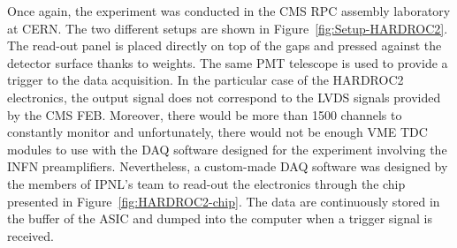 	Once again, the experiment was conducted in the CMS RPC assembly laboratory at CERN. The two different setups are shown in Figure~\ref{fig:Setup-HARDROC2}. The read-out panel is placed directly on top of the gaps and pressed against the detector surface thanks to weights. The same PMT telescope is used to provide a trigger to the data acquisition. In the particular case of the HARDROC2 electronics, the output signal does not correspond to the LVDS signals provided by the CMS FEB. Moreover, there would be more than 1500 channels to constantly monitor and unfortunately, there would not be enough VME TDC modules to use with the DAQ software designed for the experiment involving the INFN preamplifiers. Nevertheless, a custom-made DAQ software was designed by the members of IPNL's team to read-out the electronics through the chip presented in Figure~\ref{fig:HARDROC2-chip}. The data are continuously stored in the buffer of the ASIC and dumped into the computer when a trigger signal is received.
	
\endgroup
	
